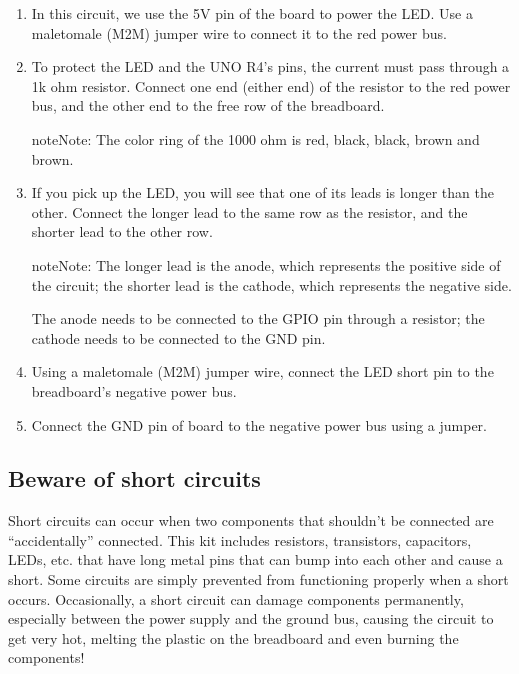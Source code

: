 \documentclass[a4paper,11pt,english]{sphinxmanual}
\begin{document}
\begin{enumerate}
%
\item {} 
\sphinxAtStartPar
In this circuit, we use the 5V pin of the board to power the LED. Use a male\sphinxhyphen{}to\sphinxhyphen{}male (M2M) jumper wire to connect it to the red power bus.

\item {} 
\sphinxAtStartPar
To protect the LED and the UNO R4’s pins, the current must pass through a 1k ohm resistor. Connect one end (either end) of the resistor to the red power bus, and the other end to the free row of the breadboard.

\begin{sphinxadmonition}{note}{Note:}
\sphinxAtStartPar
The color ring of the 1000 ohm {\hyperref[\detokenize{Components_Kit/component_resistor:component-resistor}]{}} is red, black, black, brown and brown.
\end{sphinxadmonition}

\item {} 
\sphinxAtStartPar
If you pick up the LED, you will see that one of its leads is longer than the other. Connect the longer lead to the same row as the resistor, and the shorter lead to the other row.

\begin{sphinxadmonition}{note}{Note:}
\sphinxAtStartPar
The longer lead is the anode, which represents the positive side of the circuit; the shorter lead is the cathode, which represents the negative side.

\sphinxAtStartPar
The anode needs to be connected to the GPIO pin through a resistor; the cathode needs to be connected to the GND pin.
\end{sphinxadmonition}

\item {} 
\sphinxAtStartPar
Using a male\sphinxhyphen{}to\sphinxhyphen{}male (M2M) jumper wire, connect the LED short pin to the breadboard’s negative power bus.

\item {} 
\sphinxAtStartPar
Connect the GND pin of board to the negative power bus using a jumper.

\end{enumerate}


\subsection{Beware of short circuits}
\label{\detokenize{Get_Started_with_Arduino/How_to_Build_the_Circuit:beware-of-short-circuits}}
\sphinxAtStartPar
Short circuits can occur when two components that shouldn’t be connected are “accidentally” connected.
This kit includes resistors, transistors, capacitors, LEDs, etc. that have long metal pins that can bump into each other and cause a short. Some circuits are simply prevented from functioning properly when a short occurs. Occasionally, a short circuit can damage components permanently, especially between the power supply and the ground bus, causing the circuit to get very hot, melting the plastic on the breadboard and even burning the components!
\end{document}
